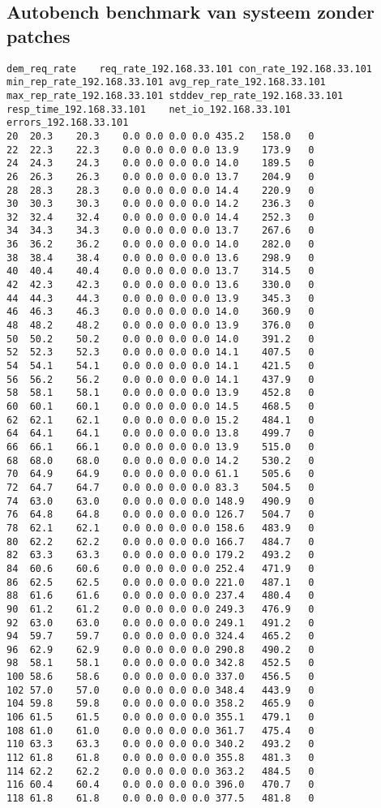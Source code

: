 \subsection{Autobench benchmark van systeem zonder patches}

\begin{lstlisting}[caption={Eerste 50 resultaten}, basicstyle=\footnotesize]
dem_req_rate	req_rate_192.168.33.101	con_rate_192.168.33.101	min_rep_rate_192.168.33.101	avg_rep_rate_192.168.33.101	max_rep_rate_192.168.33.101	stddev_rep_rate_192.168.33.101	resp_time_192.168.33.101	net_io_192.168.33.101	errors_192.168.33.101
20	20.3	20.3	0.0	0.0	0.0	0.0	435.2	158.0	0
22	22.3	22.3	0.0	0.0	0.0	0.0	13.9	173.9	0
24	24.3	24.3	0.0	0.0	0.0	0.0	14.0	189.5	0
26	26.3	26.3	0.0	0.0	0.0	0.0	13.7	204.9	0
28	28.3	28.3	0.0	0.0	0.0	0.0	14.4	220.9	0
30	30.3	30.3	0.0	0.0	0.0	0.0	14.2	236.3	0
32	32.4	32.4	0.0	0.0	0.0	0.0	14.4	252.3	0
34	34.3	34.3	0.0	0.0	0.0	0.0	13.7	267.6	0
36	36.2	36.2	0.0	0.0	0.0	0.0	14.0	282.0	0
38	38.4	38.4	0.0	0.0	0.0	0.0	13.6	298.9	0
40	40.4	40.4	0.0	0.0	0.0	0.0	13.7	314.5	0
42	42.3	42.3	0.0	0.0	0.0	0.0	13.6	330.0	0
44	44.3	44.3	0.0	0.0	0.0	0.0	13.9	345.3	0
46	46.3	46.3	0.0	0.0	0.0	0.0	14.0	360.9	0
48	48.2	48.2	0.0	0.0	0.0	0.0	13.9	376.0	0
50	50.2	50.2	0.0	0.0	0.0	0.0	14.0	391.2	0
52	52.3	52.3	0.0	0.0	0.0	0.0	14.1	407.5	0
54	54.1	54.1	0.0	0.0	0.0	0.0	14.1	421.5	0
56	56.2	56.2	0.0	0.0	0.0	0.0	14.1	437.9	0
58	58.1	58.1	0.0	0.0	0.0	0.0	13.9	452.8	0
60	60.1	60.1	0.0	0.0	0.0	0.0	14.5	468.5	0
62	62.1	62.1	0.0	0.0	0.0	0.0	15.2	484.1	0
64	64.1	64.1	0.0	0.0	0.0	0.0	13.8	499.7	0
66	66.1	66.1	0.0	0.0	0.0	0.0	13.9	515.0	0
68	68.0	68.0	0.0	0.0	0.0	0.0	14.2	530.2	0
70	64.9	64.9	0.0	0.0	0.0	0.0	61.1	505.6	0
72	64.7	64.7	0.0	0.0	0.0	0.0	83.3	504.5	0
74	63.0	63.0	0.0	0.0	0.0	0.0	148.9	490.9	0
76	64.8	64.8	0.0	0.0	0.0	0.0	126.7	504.7	0
78	62.1	62.1	0.0	0.0	0.0	0.0	158.6	483.9	0
80	62.2	62.2	0.0	0.0	0.0	0.0	166.7	484.7	0
82	63.3	63.3	0.0	0.0	0.0	0.0	179.2	493.2	0
84	60.6	60.6	0.0	0.0	0.0	0.0	252.4	471.9	0
86	62.5	62.5	0.0	0.0	0.0	0.0	221.0	487.1	0
88	61.6	61.6	0.0	0.0	0.0	0.0	237.4	480.4	0
90	61.2	61.2	0.0	0.0	0.0	0.0	249.3	476.9	0
92	63.0	63.0	0.0	0.0	0.0	0.0	249.1	491.2	0
94	59.7	59.7	0.0	0.0	0.0	0.0	324.4	465.2	0
96	62.9	62.9	0.0	0.0	0.0	0.0	290.8	490.2	0
98	58.1	58.1	0.0	0.0	0.0	0.0	342.8	452.5	0
100	58.6	58.6	0.0	0.0	0.0	0.0	337.0	456.5	0
102	57.0	57.0	0.0	0.0	0.0	0.0	348.4	443.9	0
104	59.8	59.8	0.0	0.0	0.0	0.0	358.2	465.9	0
106	61.5	61.5	0.0	0.0	0.0	0.0	355.1	479.1	0
108	61.0	61.0	0.0	0.0	0.0	0.0	361.7	475.4	0
110	63.3	63.3	0.0	0.0	0.0	0.0	340.2	493.2	0
112	61.8	61.8	0.0	0.0	0.0	0.0	355.8	481.3	0
114	62.2	62.2	0.0	0.0	0.0	0.0	363.2	484.5	0
116	60.4	60.4	0.0	0.0	0.0	0.0	396.0	470.7	0
118	61.8	61.8	0.0	0.0	0.0	0.0	377.5	481.8	0

\end{lstlisting}


